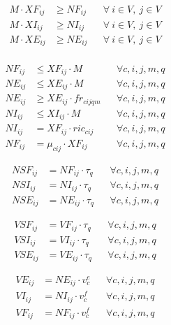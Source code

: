 \begin{align}
    M \cdot XF_{ij} &\geq NF_{ij} &&  \forall \ i \in V,\ j \in V \\ 
    M \cdot XI_{ij} &\geq NI_{ij} &&  \forall \ i \in V,\ j \in V \\ 
    M \cdot XE_{ij} &\geq NE_{ij} &&  \forall \ i \in V,\ j \in V \\ 
\end{align}

\begin{align}
    NF_{ij} &\leq XF_{ij} \cdot M 
    && \forall c, i, j, m, q \\
    NE_{ij} &\leq XE_{ij} \cdot M 
    && \forall c, i, j, m, q \\
    NE_{ij} &\geq XE_{ij} \cdot fr_{cijqm} 
    && \forall c, i, j, m, q \\
    NI_{ij} &\leq XI_{ij} \cdot M 
    && \forall c, i, j, m, q \\
    NI_{ij} &= XF_{ij} \cdot ric_{cij} 
    && \forall c, i, j, m, q \\
    NF_{ij} &= \mu_{cij} \cdot XF_{ij} 
    && \forall c, i, j, m, q 
\end{align}

\begin{align}
    NSF_{ij} &= NF_{ij} \cdot \tau_q 
    && \forall c, i, j, m, q \\
    NSI_{ij} &= NI_{ij} \cdot \tau_q 
    && \forall c, i, j, m, q \\
    NSE_{ij} &= NE_{ij} \cdot \tau_q 
    && \forall c, i, j, m, q
\end{align}

\begin{align}
    VSF_{ij} &= VF_{ij} \cdot \tau_q 
    && \forall c, i, j, m, q \\
    VSI_{ij} &= VI_{ij} \cdot \tau_q 
    && \forall c, i, j, m, q \\
    VSE_{ij} &= VE_{ij} \cdot \tau_q 
    && \forall c, i, j, m, q
\end{align}

\begin{align}
    VE_{ij} &= NE_{ij} \cdot v^e_c 
    && \forall c, i, j, m, q \\
    VI_{ij} &= NI_{ij} \cdot v^f_c 
    && \forall c, i, j, m, q \\
    VF_{ij} &= NF_{ij} \cdot v^f_c 
    && \forall c, i, j, m, q
\end{align}

